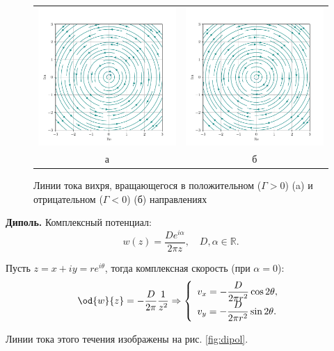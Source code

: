 \documentclass[a4paper, 14pt]{extarticle}
\begin{document}
\begin{problems}
\begin{figure}
	\centering
	\begin{tabular}{cc}
		\includegraphics[width=0.45\linewidth]{../img/rot_Gamma_g_0.pdf} &
		\includegraphics[width=0.45\linewidth]{../img/rot_Gamma_l_0.pdf} \\
		а & б 
	\end{tabular}
	\caption{Линии тока вихря, вращающегося в положительном ($\Gamma > 0$) (a) и отрицательном ($\Gamma < 0$) (б) направлениях}
	\label{fig:rotor}
\end{figure}

\item
\textbf{Диполь.}		
Комплексный потенциал:
\[
	w(z) = \frac{D e^{i\alpha}}{2\pi z},\quad
	D,\alpha \in\mathbb{R}.
\]
						
Пусть $z=x+iy=re^{i\theta}$, тогда комплексная скорость (при $\alpha=0$):
\[
	\od{w}{z} = -\frac{D}{2\pi}\frac{1}{z^2} \Rightarrow\displaystyle
	\left\{
	\begin{array}{l}
		v_x = -\displaystyle\frac{D}{2\pi r^2} \cos 2\theta,\\
		v_y = -\displaystyle\frac{D}{2\pi r^2} \sin 2\theta.
	\end{array}
	\right.
\]

Линии тока этого течения изображены на рис. \ref{fig:dipol}.


\end{problems}
\end{document}
